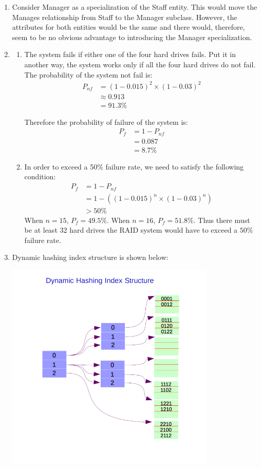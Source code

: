 \documentclass[11pt]{article}
\begin{document}
\begin{enumerate}
\item
  Consider Manager as a specialization of the Staff entity. This would
  move the Manages relationship from Staff to the Manager
  subclass. However, the attributes for both entities would be the
  same and there would, therefore, seem to be no obvious advantage to
  introducing the Manager specialization.

\item
  \begin{enumerate}
  \item The system fails if either one of the four hard drives
    fails. Put it in another way, the system works only if all the
    four hard drives do not fail. The probability of the system not
    fail is:
    \begin{align}
      P_{nf} &= (1-0.015)^2 \times (1-0.03)^2\\
      &\approx 0.913\\
      &= 91.3\%
    \end{align}

    Therefore the probability of failure of the system is:
    \begin{align}
      P_{f} &= 1 - P_{nf}\\
      &= 0.087\\
      &= 8.7\%
    \end{align}

  \item In order to exceed a 50\% failure rate, we need to satisfy the
    following condition:
    \begin{align}
      P_{f} &= 1 - P_{nf}\\
      &= 1 - ((1-0.015)^{n} \times (1-0.03)^{n})\\
      &> 50\%
    \end{align}
    When $n=15$, $P_f = 49.5\%$. When $n=16$, $P_f = 51.8\%$. Thus
    there must be at least 32 hard drives the RAID system would have
    to exceed a $50\%$ failure rate.
  \end{enumerate}

\item Dynamic hashing index structure is shown below:
  \begin{center}
    \includegraphics[width=10cm,height=10cm]{cs460-hw1-Q12.png}
  \end{center}


\end{enumerate}
\end{document}
